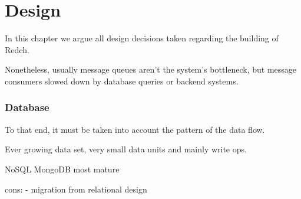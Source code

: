 \chapter{Design}

In this chapter we argue all design decisions taken regarding the building of Redch. 

Nonetheless, usually message queues aren't the system's bottleneck, but message consumers slowed down by database queries or backend systems.

\subsection{Database}

To that end, it must be taken into account the pattern of the data flow.
  
Ever growing data set, very small data units and mainly write ops.


NoSQL
MongoDB most mature

cons: 
- migration from relational design